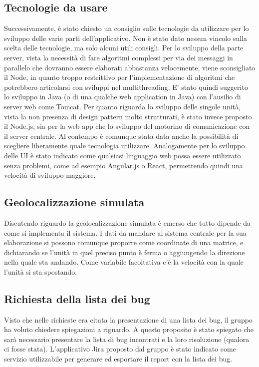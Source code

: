 \subsection{Tecnologie da usare}
Successivamente, è stato chiesto un consiglio sulle tecnologie da utilizzare per lo sviluppo delle varie parti dell'applicativo. Non è stato dato nessun vincolo sulla scelta delle tecnologie, ma solo alcuni utili consigli.
Per lo sviluppo della parte server, vista la necessità di fare algoritmi complessi per via dei messaggi in parallelo che dovranno essere elaborati abbastanza velocemente, viene sconsigliato il Node, in quanto troppo restrittivo per l'implementazione di algoritmi che potrebbero articolarsi con sviluppi nel multithreading.
E' stato quindi suggerito lo sviluppo in Java (o di una qualche web application in Java) con l'ausilio di server web come Tomcat. 
Per quanto riguarda lo sviluppo delle singole unità, vista la non presenza di design pattern molto strutturati, è stato invece proposto il Node.js, sia per la web app che lo sviluppo del motorino di comunicazione con il server centrale. Al contempo è comunque stata data anche la possibilità di scegliere liberamente quale tecnologia utilizzare. Analogamente per lo sviluppo delle UI è stato indicato come qualsiasi linguaggio web possa essere utilizzato senza problemi, come ad esempio Angular.js o React, permettendo quindi una velocità di sviluppo maggiore.

\subsection{Geolocalizzazione simulata}
Discutendo riguardo la geolocalizzazione simulata è emerso che tutto dipende da come si implementa il sistema. I dati da mandare al sistema centrale per la sua elaborazione si possono comunque proporre come coordinate di una matrice, e dichiarando se l'unità in quel preciso punto è ferma o aggiungendo la direzione nella quale sta andando. Come variabile facoltativa c'è la velocità con la quale l'unità si sta spostando. 

\subsection{Richiesta della lista dei bug}
Visto che nelle richieste era citata la presentazione di una lista dei bug, il gruppo ha voluto chiedere spiegazioni a riguardo. A questo proposito è stato spiegato che sarà necessario presentare la lista di bug incontrati e la loro risoluzione (qualora ci fosse stata). L'applicativo Jira proposto dal gruppo è stato indicato come servizio utilizzabile per generare ed esportare il report con la lista dei bug.

